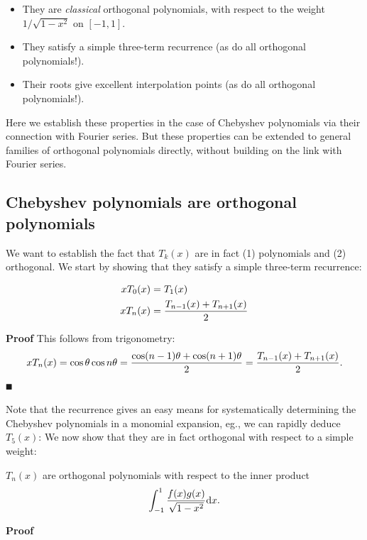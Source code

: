 \begin{itemize}
\item[1. ] They are \emph{classical} orthogonal polynomials, with respect to the weight $1/\sqrt{1-x^2}$ on $[-1,1]$.


\item[2. ] They satisfy a simple three-term recurrence (as do all orthogonal polynomials!).


\item[3. ] Their roots give excellent interpolation points (as do all orthogonal polynomials!).

\end{itemize}
Here we establish these properties in the case of Chebyshev polynomials via their connection with Fourier series. But these properties can be extended to general families of orthogonal polynomials directly, without building on the link with Fourier series.

\subsection{Chebyshev polynomials are orthogonal polynomials}
We want to establish the fact that $T_k(x)$ are in fact (1) polynomials and (2) orthogonal. We start by showing that they satisfy a simple three-term recurrence:

\begin{lemma}
\begin{align*}
x T_0(x) &= T_1(x) \\
x T_n(x) &= {T_{n-1}(x) + T_{n+1}(x) \over 2}
\end{align*}
\end{lemma}
\textbf{Proof} This follows from trigonometry:
\[
x T_n(x) = \cos \ensuremath{\theta} \cos n \ensuremath{\theta} = {\cos(n-1)\ensuremath{\theta} + \cos(n+1)\ensuremath{\theta} \over 2} = {T_{n-1}(x) + T_{n+1}(x) \over 2}.
\]
\ensuremath{\QED}

Note that the recurrence gives an easy means for systematically determining the Chebyshev polynomials in a monomial expansion, eg., we can rapidly deduce $T_5(x)$:
We now show that they are in fact orthogonal with respect to a simple weight:

\begin{theorem} $T_n(x)$ are orthogonal polynomials with respect to the inner product
\[
\int_{-1}^1 {f(x) g(x) \over \sqrt{1-x^2}} {\rm d} x.
\]
\end{theorem}
\textbf{Proof}

